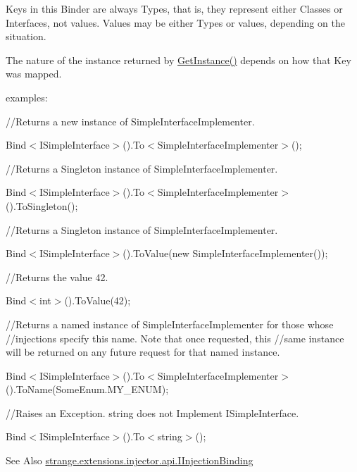 Keys in this Binder are always Types, that is, they represent either Classes or Interfaces, not values. Values may be either Types or values, depending on the situation.

The nature of the instance returned by {\ttfamily \hyperlink{interfacestrange_1_1extensions_1_1injector_1_1api_1_1_i_injection_binder_a08359dc92534704919a0e9b89375db18}{Get\-Instance()}} depends on how that Key was mapped.

examples\-:

//\-Returns a new instance of Simple\-Interface\-Implementer.

{\ttfamily Bind$<$I\-Simple\-Interface$>$().To$<$Simple\-Interface\-Implementer$>$();}

//\-Returns a Singleton instance of Simple\-Interface\-Implementer.

{\ttfamily Bind$<$I\-Simple\-Interface$>$().To$<$Simple\-Interface\-Implementer$>$().To\-Singleton();}

//\-Returns a Singleton instance of Simple\-Interface\-Implementer.

{\ttfamily Bind$<$I\-Simple\-Interface$>$().To\-Value(new Simple\-Interface\-Implementer());}

//\-Returns the value 42.

{\ttfamily Bind$<$int$>$().To\-Value(42);}

//\-Returns a named instance of Simple\-Interface\-Implementer for those whose //injections specify this name. Note that once requested, this //same instance will be returned on any future request for that named instance.

{\ttfamily Bind$<$I\-Simple\-Interface$>$().To$<$Simple\-Interface\-Implementer$>$().To\-Name(Some\-Enum.\-M\-Y\-\_\-\-E\-N\-U\-M);}

//\-Raises an Exception. string does not Implement I\-Simple\-Interface.

{\ttfamily Bind$<$I\-Simple\-Interface$>$().To$<$string$>$();}

\begin{DoxySeeAlso}{See Also}
\hyperlink{interfacestrange_1_1extensions_1_1injector_1_1api_1_1_i_injection_binding}{strange.\-extensions.\-injector.\-api.\-I\-Injection\-Binding} 
\end{DoxySeeAlso}



